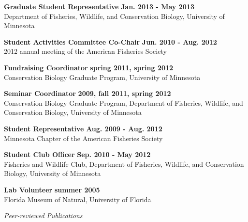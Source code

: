 \documentclass[letterpaper,12pt]{article}
\newcommand{\sectitle}[1]{\vspace{\baselineskip} \centerline{\large{\textit{#1}}}}
\begin{document}
{\bf Graduate Student Representative} \hfill {\bf Jan. 2013 - May 2013} \\
Department of Fisheries, Wildlife, and Conservation Biology, University of Minnesota

{\bf Student Activities Committee Co-Chair} \hfill {\bf Jun. 2010 - Aug. 2012} \\
2012 annual meeting of the American Fisheries Society

{\bf Fundraising Coordinator} \hfill {\bf spring 2011, spring 2012} \\
Conservation Biology Graduate Program, University of Minnesota

{\bf Seminar Coordinator} \hfill {\bf 2009, fall 2011, spring 2012} \\
Conservation Biology Graduate Program, Department of Fisheries, Wildlife, and Conservation Biology, University of Minnesota

{\bf Student Representative} \hfill {\bf Aug. 2009 - Aug. 2012} \\
Minnesota Chapter of the American Fisheries Society

{\bf Student Club Officer} \hfill {\bf Sep. 2010 - May 2012} \\
Fisheries and Wildlife Club, Department of Fisheries, Wildlife, and Conservation Biology, University of Minnesota 

{\bf Lab Volunteer} \hfill {\bf summer 2005} \\
Florida Museum of Natural, University of Florida

\sectitle{Peer-reviewed Publications}
\end{document}
